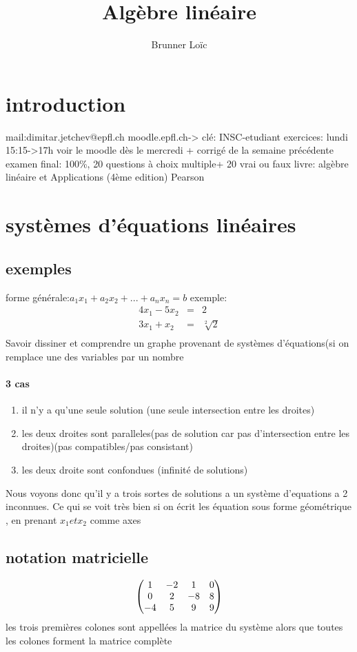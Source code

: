 \documentclass[a4paper,10pt]{article}
\title{Algèbre linéaire}
\author{Brunner Loïc}
\begin{document}
\maketitle


\section{introduction}
mail:dimitar.jetchev@epfl.ch
\newline
moodle.epfl.ch-> clé: INSC-etudiant
\newline
exercices: lundi 15:15->17h voir le moodle dès le mercredi + corrigé de la semaine précédente
\newline
examen final: 100\%, 20 questions à choix multiple+ 20 vrai ou faux
\newline
livre: algèbre linéaire et Applications (4ème edition) Pearson
\section{systèmes d'équations linéaires}
\subsection{exemples}
forme générale:$a_1x_1+a_2x_2+...+a_nx_n = b$
exemple:
\begin{eqnarray}
 4x_1-5x_2 & = & 2\\
 3x_1+x_2 & = & \sqrt[2]{2}\\
\end{eqnarray}
Savoir dissiner et comprendre un graphe provenant de systèmes d'équations(si on remplace une des variables par un nombre
\paragraph{3 cas}
\begin{enumerate}
 \item il n'y a qu'une seule solution (une seule intersection entre les droites)
 \item les deux droites sont paralleles(pas de solution car pas d'intersection entre les droites)(pas compatibles/pas consistant)
 \item les deux droite sont confondues (infinité de solutions)
\end{enumerate}
Nous voyons donc qu'il y a trois sortes de solutions a un système d'equations a 2 inconnues. Ce qui se voit très bien si on écrit les équation sous forme géométrique
, en prenant $x_1 et x_2$ comme axes 
\subsection{notation matricielle}
\[
\begin{pmatrix}%
1 & -2 & 1 & 0\cr
0 & 2 & -8 & 8\cr
-4 & 5 & 9 & 9 
\end{pmatrix}
\]
 les trois premières colones sont appellées la matrice du système alors que toutes les colones forment la matrice complète
\end{document}
